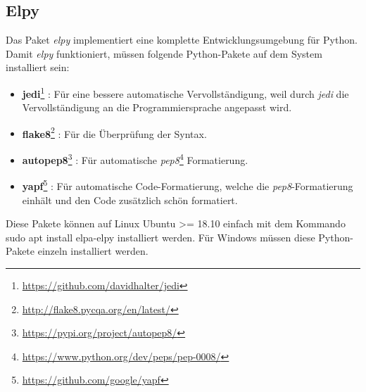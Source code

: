 \subsection{Elpy}
\label{subsec:elpy}
Das Paket \textit{elpy} implementiert eine komplette
Entwicklungsumgebung für Python. Damit \textit{elpy} funktioniert,
müssen folgende Python-Pakete auf dem System installiert sein:
\begin{itemize}
\item
  \textbf{jedi}\footnote{\url{https://github.com/davidhalter/jedi}} :
  Für eine bessere automatische Vervollständigung, weil durch
  \textit{jedi} die Vervollständigung an die Programmiersprache
  angepasst wird.
\item
  \textbf{flake8}\footnote{\url{http://flake8.pycqa.org/en/latest/}} :
  Für die Überprüfung der Syntax.
\item
  \textbf{autopep8}\footnote{\url{https://pypi.org/project/autopep8/}}
  : Für automatische
  \textit{pep8}\footnote{\url{https://www.python.org/dev/peps/pep-0008/}}
  Formatierung.
\item \textbf{yapf}\footnote{\url{https://github.com/google/yapf}} :
  Für automatische Code-Formatierung, welche die
  \textit{pep8}-Formatierung einhält und den Code zusätzlich
         {\glqq}schön{\grqq} formatiert.
\end{itemize}
Diese Pakete können auf Linux Ubuntu >= 18.10 einfach mit dem Kommando
{\glqq}sudo apt install elpa-elpy{\grqq} installiert werden. Für
Windows müssen diese Python-Pakete einzeln installiert
werden. \cite{Elpy}\\

